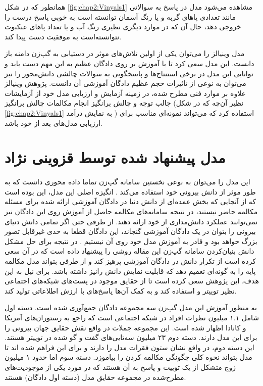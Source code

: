 همانطور که در شکل
\ref{fig:chap2:Vinyals1}
مشاهده‌ می‌شود مدل در پاسخ به سوالاتی مانند تعدادی پا‌های گربه و یا رنگ آسمان توانسته‌ است به خوبی پاسخ درست را خروجی دهد، حال آن که در موارد دیگری نظیری رنگ آب و یا تعداد پاهای عنکبوت نتوانسته‌است به موفقیت دست پیدا کند.

مدل وینیالز را می‌توان یکی از اولین تلاش‌های موثر در دستیابی به گپ‌زن دامنه باز دانست. این مدل سعی کرد تا با آموزش بر روی دادگان عظیم 
به این مهم دست یابد و توانایی این مدل در برخی استنتاج‌‌ها و پاسخگویی به سوالات چالشی دانش‌محور را نیز می‌توان به نوعی از تاثیرات حجم عظیم دادگان‌ آموزشی آن دانست.
\cite{Tiedemann2009NewsFO}
 پژوهش وینیالز علاوه بر موارد فنی مطرح شده، در زمینه آزمایش و ارزیابی مدل خود از آزمایشات جالب توجه و چالش بر‌انگیز  انجام مکالمات چالش برانگیز 
(نظیر آن‌چه که در شکل 
\ref{fig:chap2:Vinyals1}
به نمایش درآمد
)
استفاده کرد که می‌تواند نمونه‌ای‌ مناسب برای ارزیابی مدل‌های بعد از خود باشد. 

\section{مدل پیشنهاد شده توسط قزوینی نژاد}
این مدل را می‌توان به نوعی نخستین سامانه گپ‌زن تماما داده محوری دانست که به طور موثر از دانش بیرونی خود استفاده می‌کند
\cite{a_knowledge_grounded}.
انگیزه اصلی این مدل، این بوده است که از آنجایی که بخش عمده‌ای از دانش دنیا در دادگان آموزشی ارائه شده برای مسئله مکالمه حاضر نیستند، در نتیجه سامانه‌های مکالمه حاصل از آموزش روی این دادگان نیز نمی‌توانند عملکرد دانش‌مداری از خود ارائه دهند. از طرفی حتی اگر تمامی دانش دنیای بیرونی را بتوان در یک دادگان آموزشی گنجاند، این دادگان قطعا به حدی غیرقابل تصور بزرگ خواهد بود و قادر به آموزش مدل خود روی آن نیستیم
\cite{a_knowledge_grounded}.
در نتیجه برای حل مشکل دانش بنیان‌کردن سامانه‌ گپ‌زن این مقاله روشی را پیشنهاد داده است که در آن سعی کرده است از تکرار دانش در دادگان آموزشی پرهیز کند و از طرفی بتواند مدل مکالمه پایه را به گونه‌ای تعمیم دهد که قابلیت نمایش دانش  رانیز داشته باشد. برای نیل به این هدف، این پژوهش سعی کرده است تا از حقایق موجود در پست‌های شبکه‌های اجتماعی نظیر توییتر و 
استفاده کند و به کمک آن‌ها پاسخ‌های با ارزش اطلاعاتی تولید کند.

به منظور آموزش این مدل گپ‌زن سه مجموعه دادگان جمع‌آوری شده است. دسته اول شامل ۱.۱ میلیون نظرات افراد در شبکه اجتماعی 
است که راجع به رستوران‌های آمریکا و کانادا اظهار شده است. این مجموعه جملات در واقع نقش حقایق جهان بیرونی را برای این مدل دارند. دسته دوم ۲۳ میلیون سه‌تایی‌های گفت و گو شده در
توییتر
هستند. این دسته دوم، در واقع نشان ستون فقرات مدل را دارند و برای این فراهم شده اند تا مدل بتواند نحوه کلی چگونگی مکالمه کردن را بیاموزد.
دسته سوم اما حدود ۱ میلیون زوج متشکل از یک توییت و پاسخ به آن هستند که  در مورد یکی از موجودیت‌های مطرح‌شده در مجموعه حقایق مدل (دسته اول دادگان) هستند.

